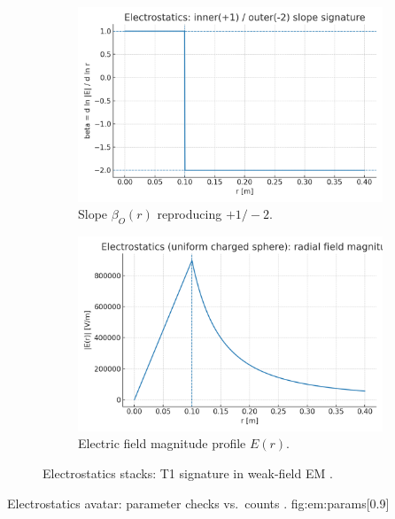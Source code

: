 \documentclass[12pt,a4paper,oneside]{scrreprt}
\begin{document}
\begin{figure}[htbp]
  \vspace{0.6em}
  \begin{subfigure}[t]{0.49\linewidth}
    \includegraphics[width=\linewidth]{fig/electrostatics_beta_signature.png}
    \caption{Slope $\beta_O(r)$ reproducing $+1/-2$.}
    \label{fig:em:beta}
  \end{subfigure}\hfill
  \begin{subfigure}[t]{0.49\linewidth}
    \includegraphics[width=\linewidth]{fig/electrostatics_Emag_profile.png}
    \caption{Electric field magnitude profile $E(r)$.}
    \label{fig:em:Emag}
  \end{subfigure}
  \caption{Electrostatics stacks: T1 signature in weak-field EM
  \cite{Jackson1999,Griffiths2017}.}
  \label{fig:em:t1}
\end{figure}

       {Electrostatics avatar: parameter checks vs.\ counts
       \cite{Zangwill2012,Purcell2013}.}
       {fig:em:params}[0.9]
\end{document}
